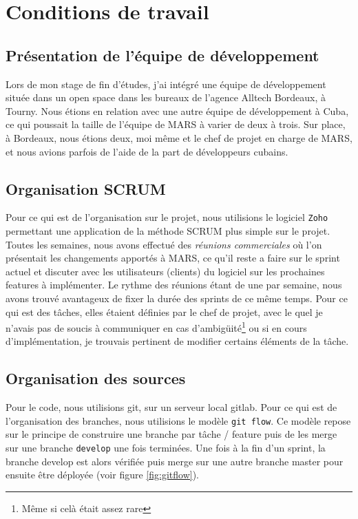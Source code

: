 \section{Conditions de travail} \label{sec:conditions_travail}

\subsection{Présentation de l'équipe de développement} \label{sec:presentation_equipe}

Lors de mon stage de fin d'études, j'ai intégré une équipe de développement située dans un open space dans les bureaux
de l'agence Alltech Bordeaux, à Tourny. Nous étions en relation avec une autre équipe de développement à Cuba, ce qui
poussait la taille de l'équipe de MARS à varier de deux à trois. Sur place, à Bordeaux, nous étions deux, moi même et 
le chef de projet en charge de MARS, et nous avions parfois de l'aide de la part de développeurs cubains. 

\subsection{Organisation SCRUM} \label{sec:organisation_scrum}

Pour ce qui est de l'organisation sur le projet, nous utilisions le logiciel \texttt{Zoho} permettant une application
de la méthode SCRUM plus simple sur le projet. Toutes les semaines, nous avons effectué des \textit{réunions 
commerciales} où l'on présentait les changements apportés à MARS, ce qu'il reste a faire sur le sprint actuel et 
discuter avec les utilisateurs (clients) du logiciel sur les prochaines features à implémenter. Le rythme des réunions
étant de une par semaine, nous avons trouvé avantageux de fixer la durée des sprints de ce même temps. Pour ce qui est 
des tâches, elles étaient définies par le chef de projet, avec le quel je n'avais pas de soucis à communiquer en cas 
d'ambigüité\footnote{Même si celà était assez rare} ou si en cours d'implémentation, je trouvais pertinent de modifier
certains éléments de la tâche.

\subsection{Organisation des sources} \label{sec:organisation_sources}

Pour le code, nous utilisions git, sur un serveur local gitlab. Pour ce qui est de l'organisation des branches, nous 
utilisions le modèle \texttt{git flow}. Ce modèle repose sur le principe de construire une branche par tâche / feature 
puis de les merge sur une branche \texttt{develop} une fois terminées. Une fois à la fin d'un sprint, la branche 
develop est alors vérifiée puis merge sur une autre branche master pour ensuite être déployée (voir figure 
\ref{fig:gitflow}).

